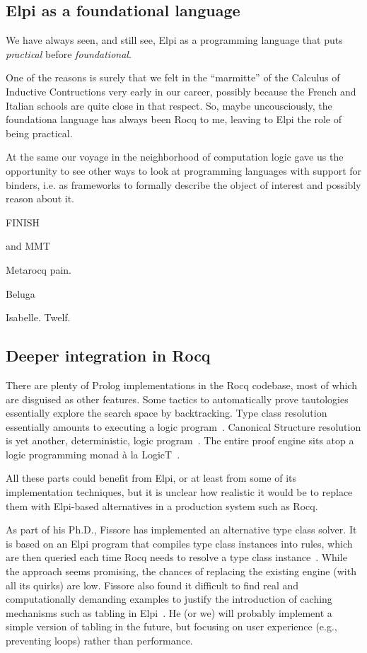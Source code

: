 \documentclass[a4paper, 11pt]{book}
\begin{document}
\subsection{Elpi as a foundational language}

We have always seen, and still see, Elpi as a programming language
that puts \emph{practical} before \emph{foundational}.

One of the reasons is surely
that we felt in the ``marmitte'' of the Calculus of
Inductive Contructions very early in our career, possibly because
the French and Italian schools are quite close in that respect.
So, maybe uncousciously, the foundationa language has always
been Rocq to me, leaving to Elpi the role of being practical.

At the same our voyage in the neighborhood of computation logic
gave us the opportunity to see other ways to look at programming
languages with support for binders, i.e. as frameworks to formally
describe the object of interest and possibly reason about it.

FINISH

 and
MMT~\cite{RABE20131}


Metarocq pain.

Beluga\cite{DBLP:conf/cade/PientkaC15,10.1007/978-3-642-12251-4_1}

Isabelle.
 Twelf.


\subsection{Deeper integration in Rocq}

There are plenty of Prolog implementations in the Rocq codebase, most of
which are disguised as other features. Some tactics to automatically prove
tautologies essentially explore the search space by backtracking. Type class
resolution essentially amounts to executing a logic program~\cite{fctc}.
Canonical Structure resolution is yet another, deterministic, logic
program~\cite{tassi13}. The entire proof engine sits atop a logic programming
monad à la LogicT~\cite{logicT}.

All these parts could benefit from Elpi, or at least from some of its
implementation techniques, but it is unclear how realistic it would be to
replace them with Elpi-based alternatives in a production system such as Rocq.

As part of his Ph.D., Fissore has implemented an alternative type class solver.
It is based on an Elpi program that compiles type class instances into rules,
which are then queried each time Rocq needs to resolve a type class
instance~\cite{newtc,unifforfree}. While the approach seems promising, the
chances of replacing the existing engine (with all its quirks) are low. Fissore
also found it difficult to find real and computationally demanding examples to
justify the introduction of caching mechanisms such as tabling in
Elpi~\cite{selsam2020tabledtypeclassresolution,brigittePHD}. He (or we) will
probably implement a simple version of tabling in the future, but focusing on
user experience (e.g., preventing loops) rather than performance.
\end{document}
